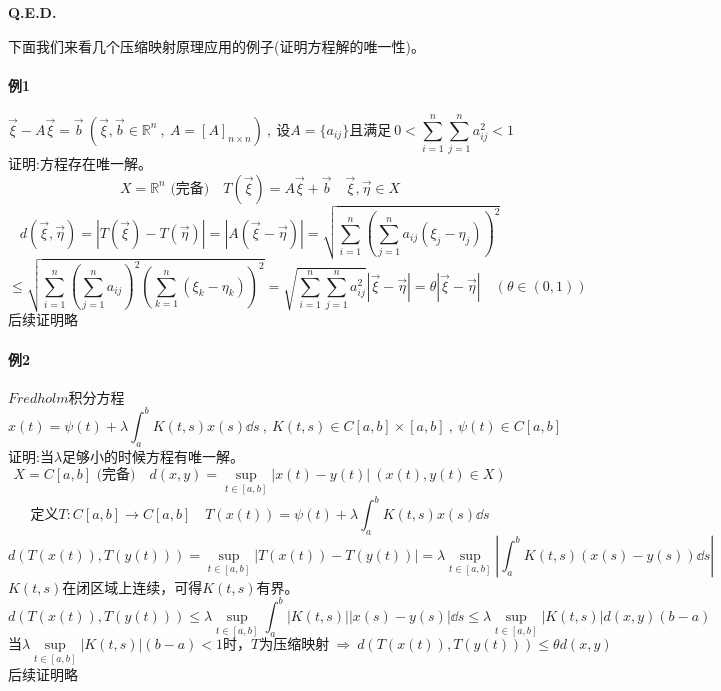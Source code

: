 \textbf{Q.E.D.}

下面我们来看几个压缩映射原理应用的例子(证明方程解的唯一性)。
\paragraph*{例1}
\[\vec{\xi}-A\vec{\xi}=\vec{b} \ (\vec{\xi},\vec{b}\in\mathbb{R}^n \ , \ A=[A]_{n \times n}) \ , \ \text{设}A=\{a_{ij}\}\text{且满足} \ 0<\sum_{i=1}^n\sum_{j=1}^na_{ij}^2<1\]
证明:方程存在唯一解。\\
\[X=\mathbb{R}^n\text{ (完备)} \quad T(\vec{\xi})=A\vec{\xi}+\vec{b} \quad \vec{\xi},\vec{\eta} \in X\]
\[d(\vec{\xi},\vec{\eta})=|T(\vec{\xi})-T(\vec{\eta})|=|A(\vec{\xi}-\vec{\eta})|=\sqrt{\sum_{i=1}^n\left(\sum_{j=1}^na_{ij}(\xi_j-\eta_j)\right)^2}\]
\[\leq \sqrt{\sum_{i=1}^n\left(\sum_{j=1}^na_{ij}\right)^2\left(\sum_{k=1}^n(\xi_k-\eta_k)\right)^2}=\sqrt{\sum_{i=1}^n\sum_{j=1}^na_{ij}^2}|\vec{\xi}-\vec{\eta}|=\theta|\vec{\xi}-\vec{\eta}| \quad (\theta \in (0,1))\]
后续证明略
\paragraph*{例2} \quad $Fredholm$积分方程
\[x(t)=\psi(t)+\lambda\int_a^bK(t,s)x(s)\dd s \ , \ K(t,s) \in C[a,b] \times [a,b] \ , \ \psi(t) \in C[a,b]\]
证明:当$\lambda$足够小的时候方程有唯一解。\\
\[X=C[a,b]\text{ (完备)} \quad d(x,y)=\mathop {\text{sup}}\limits_{t \in [a,b]}|x(t)-y(t)| \ (x(t),y(t) \in X)\]
\[\text{定义}T:C[a,b] \to C[a,b] \quad T(x(t))=\psi(t)+\lambda\int_a^bK(t,s)x(s)\dd s\]
\[d(T(x(t)),T(y(t)))=\mathop {\text{sup}}\limits_{t \in [a,b]}|T(x(t))-T(y(t))|=\lambda\mathop {\text{sup}}\limits_{t \in [a,b]}\left|\int_a^bK(t,s)(x(s)-y(s))\dd s\right|\]
$K(t,s)$在闭区域上连续，可得$K(t,s)$有界。
\[d(T(x(t)),T(y(t))) \leq \lambda\mathop {\text{sup}}\limits_{t \in [a,b]}\int_a^b|K(t,s)||x(s)-y(s)|\dd s \leq \lambda\mathop {\text{sup}}\limits_{t \in [a,b]}|K(t,s)|d(x,y)(b-a)\]
\[\text{当}\lambda\mathop {\text{sup}}\limits_{t \in [a,b]}|K(t,s)|(b-a)<1\text{时，$T$为压缩映射} \ \Rightarrow \ d(T(x(t)),T(y(t))) \leq \theta d(x,y)\]
后续证明略

